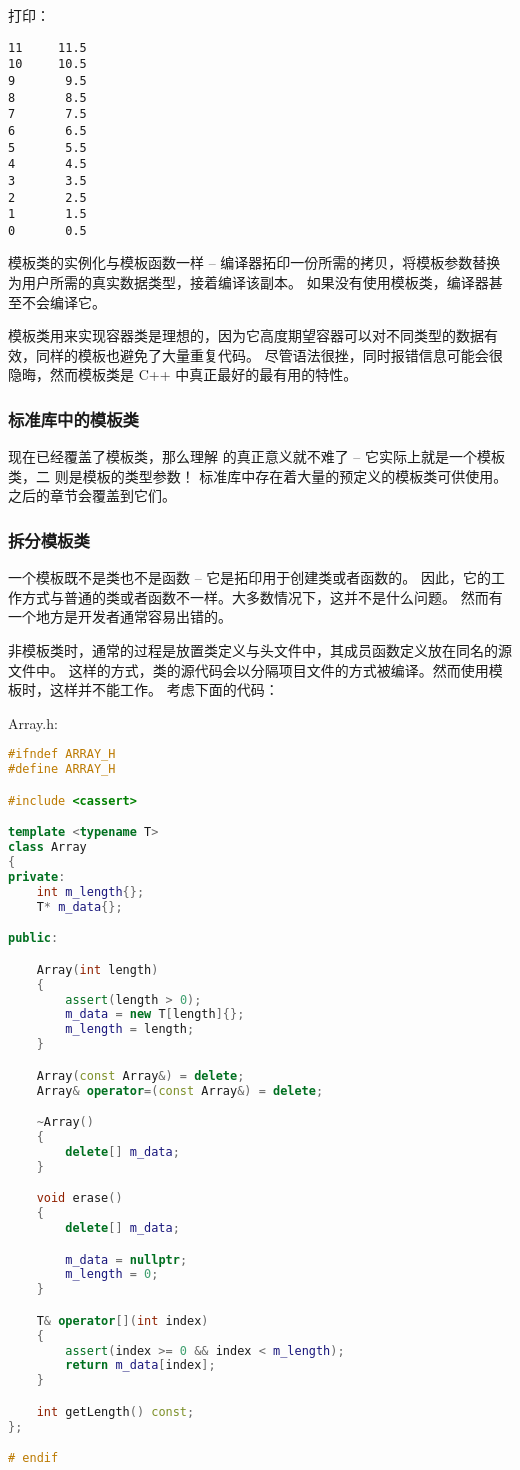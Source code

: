 \documentclass[../../LearnCpp.tex]{subfiles}
\begin{document}
打印：

\begin{lstlisting}
11     11.5
10     10.5
9       9.5
8       8.5
7       7.5
6       6.5
5       5.5
4       4.5
3       3.5
2       2.5
1       1.5
0       0.5
\end{lstlisting}

模板类的实例化与模板函数一样 --
编译器拓印一份所需的拷贝，将模板参数替换为用户所需的真实数据类型，接着编译该副本。
如果没有使用模板类，编译器甚至不会编译它。

模板类用来实现容器类是理想的，因为它高度期望容器可以对不同类型的数据有效，同样的模板也避免了大量重复代码。
尽管语法很挫，同时报错信息可能会很隐晦，然而模板类是 C++ 中真正最好的最有用的特性。

\subsubsection*{标准库中的模板类}

现在已经覆盖了模板类，那么理解  的真正意义就不难了 --
它实际上就是一个模板类，二  则是模板的类型参数！
标准库中存在着大量的预定义的模板类可供使用。之后的章节会覆盖到它们。

\subsubsection*{拆分模板类}

一个模板既不是类也不是函数 -- 它是拓印用于创建类或者函数的。
因此，它的工作方式与普通的类或者函数不一样。大多数情况下，这并不是什么问题。
然而有一个地方是开发者通常容易出错的。

非模板类时，通常的过程是放置类定义与头文件中，其成员函数定义放在同名的源文件中。
这样的方式，类的源代码会以分隔项目文件的方式被编译。然而使用模板时，这样并不能工作。
考虑下面的代码：

Array.h:

\begin{lstlisting}[language=C++]
#ifndef ARRAY_H
#define ARRAY_H

#include <cassert>

template <typename T>
class Array
{
private:
    int m_length{};
    T* m_data{};

public:

    Array(int length)
    {
        assert(length > 0);
        m_data = new T[length]{};
        m_length = length;
    }

    Array(const Array&) = delete;
    Array& operator=(const Array&) = delete;

    ~Array()
    {
        delete[] m_data;
    }

    void erase()
    {
        delete[] m_data;

        m_data = nullptr;
        m_length = 0;
    }

    T& operator[](int index)
    {
        assert(index >= 0 && index < m_length);
        return m_data[index];
    }

    int getLength() const;
};

# endif
\end{lstlisting}
\end{document}
